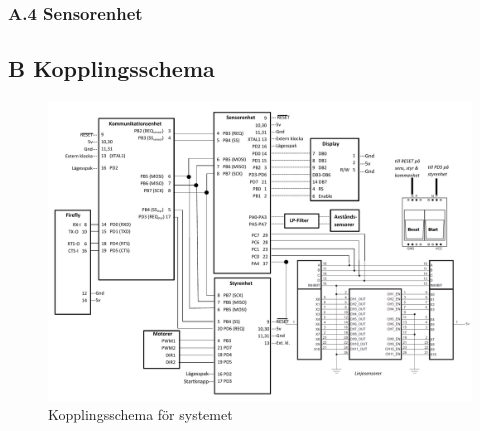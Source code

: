 \subsubsection*{A.4 \hspace*{1em} Sensorenhet}


















\subsection*{B \hspace*{1em} Kopplingsschema}
\begin{figure}[H]
 \centering
 \includegraphics[angle=270,scale=0.75]{bilder/kopplingsschema.pdf}
  \caption{Kopplingsschema för systemet}
\end{figure}
